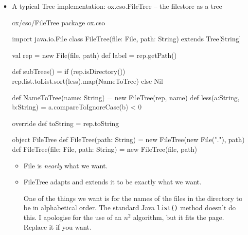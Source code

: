 \documentclass{concdistfoils}
\begin{document}
\begin{slide}
\begin{itemize}
\item A typical Tree implementation: ox.cso.FileTree -- the filestore as a tree
\vfill
\begin{hideobj}{ox/cso/FileTree}
package ox.cso
\end{hideobj}
\begin{obj}{}
import  java.io.File
class FileTree(file: File, path: String) extends Tree[String]
{ val rep   = new File(file, path)
  def label = rep.getPath()

  def subTrees() = 
   if (rep.isDirectory()) rep.list.toList.sort(less).map(NameToTree) else Nil
      
  def NameToTree(name: String) = new FileTree(rep, name)
  def less(a:String, b:String) = a.compareToIgnoreCase(b) < 0
  
  override def toString = rep.toString
}

object FileTree
{ def FileTree(path: String)             =  new FileTree(new File("."), path)
  def FileTree(file: File, path: String) =  new FileTree(file, path)
}
\end{obj}
\vfill
\begin{smaller}
\begin{itemize}
\item File is \textit{nearly} what we want.
\item FileTree adapts and extends it to be exactly what we want.
\begin{note}
One of the things we want is for the names of the files in the directory to be
in alphabetical order. The standard Java \texttt{list()} method doesn't do this.
I apologise for the use of an $n^2$ algorithm, but it fits the page. Replace it if you want.
\end{note}
\end{itemize}
\end{smaller}
\end{itemize}
\end{slide}
\end{document}

